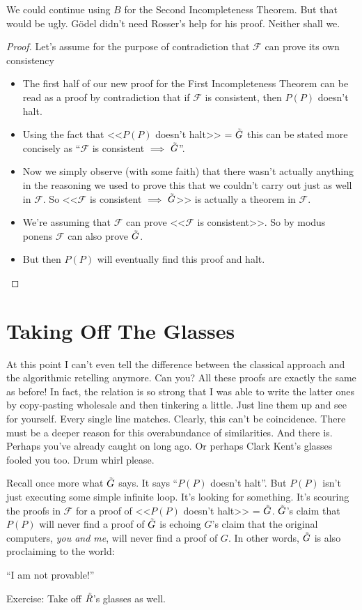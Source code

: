 \documentclass{article}
\theoremstyle{customstyle}
\newcommand{\F}{\ensuremath{\mathcal{F}}}
\newcommand{\iGoedel}{\ensuremath{\accentset{\scalebox{0.35}{$\infty$}}{G}}}
\newcommand{\iRosser}{\ensuremath{\accentset{\scalebox{0.35}{$\infty$}}{R}}}
\begin{document}
We could continue using $B$ for the Second Incompleteness Theorem. But that would be ugly. Gödel didn't need Rosser's help for his proof. Neither shall we.

\begin{proof}
Let's assume for the purpose of contradiction that $\F$ can prove its own consistency
\begin{itemize}[topsep=0.5em]
\item The first half of our new proof for the First Incompleteness Theorem can be read as a proof by contradiction that if $\F$ is consistent, then $P(P)$ doesn't halt.
\item Using the fact that <<$P(P)$ doesn't halt>> = $\iGoedel$ this can be stated more concisely as ``$\F$ is consistent $\implies$ $\iGoedel$''.
\item Now we simply observe (with some faith) that there wasn't actually anything in the reasoning we used to prove this that we couldn't carry out just as well in $\F$. So <<$\F$ is consistent $\implies$ $\iGoedel$>> is actually a theorem in $\F$.
\item We're assuming that $\F$ can prove <<$\F$ is consistent>>. So by modus ponens $\F$ can also prove $\iGoedel$.
\item But then $P(P)$ will eventually find this proof and halt. \lightning
\end{itemize}
\end{proof}

\section{Taking Off The Glasses}

At this point I can't even tell the difference between the classical approach and the algorithmic retelling anymore. Can you? All these proofs are exactly the same as before! In fact, the relation is so strong that I was able to write the latter ones by copy-pasting wholesale and then tinkering a little. Just line them up and see for yourself. Every single line matches. Clearly, this can't be coincidence. There must be a deeper reason for this overabundance of similarities. And there is. Perhaps you've already caught on long ago. Or perhaps Clark Kent's glasses fooled you too. Drum whirl please.

Recall once more what $\iGoedel$ says. It says ``$P(P)$ doesn't halt''. But $P(P)$ isn't just executing some simple infinite loop. It's looking for something. It's scouring the proofs in $\F$ for a proof of <<$P(P)$ doesn't halt>> = $\iGoedel$. $\iGoedel$'s claim that $P(P)$ will never find a proof of $\iGoedel$ is echoing $G$'s claim that the original computers, \textit{you and me}, will never find a proof of $G$. In other words, $\iGoedel$ is also proclaiming to the world:
\begin{center}
``I am not provable!''
\end{center}
Exercise: Take off $\iRosser$'s glasses as well.
\end{document}
